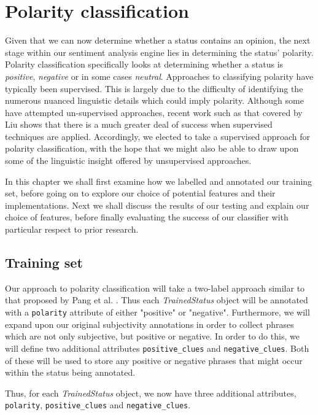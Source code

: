 \chapter{Polarity classification}
\label{polarity}

Given that we can now determine whether a status contains an opinion, the next stage within our sentiment analysis engine lies in determining the status' polarity. Polarity classification specifically looks at determining whether a status is \emph{positive}, \emph{negative} or in some cases \emph{neutral}. Approaches to classifying polarity have typically been supervised. This is largely due to the difficulty of identifying the numerous nuanced linguistic details which could imply polarity. Although some \cite{Turney:2002vv} have attempted un-supervised approaches, recent work such as that covered by Liu \cite{Liu:2010tm} shows that there is a much greater deal of success when supervised techniques are applied. Accordingly, we elected to take a supervised approach for polarity classification, with the hope that we might also be able to draw upon some of the linguistic insight offered by unsupervised approaches.

In this chapter we shall first examine how we labelled and annotated our training set, before going on to explore our choice of potential features and their implementations. Next we shall discuss the results of our testing and explain our choice of features, before finally evaluating the success of our classifier with particular respect to prior research.

\section{Training set}

Our approach to polarity classification will take a two-label approach similar to that proposed by Pang et al. \cite{Pang:2002tu}. Thus each \emph{TrainedStatus} object will be annotated with a \texttt{polarity} attribute of either "positive" or "negative". Furthermore, we will expand upon our original subjectivity annotations in order to collect phrases which are not only subjective, but positive or negative. In order to do this, we will define two additional attributes \texttt{positive\-\_clues} and \texttt{negative\-\_clues}. Both of these will be used to store any positive or negative phrases that might occur within the status being annotated.

Thus, for each \emph{TrainedStatus} object, we now have three additional attributes, \texttt{polarity}, \texttt{positive\-\_clues} and \texttt{negative\-\_clues}.

